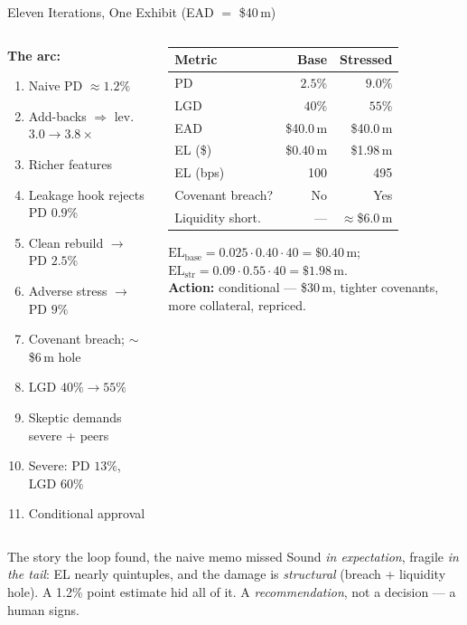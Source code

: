 \documentclass[9pt,t]{beamer}
\begin{document}
\begin{frame}{Eleven Iterations, One Exhibit (EAD $=$ \$40\,m)}

\begin{columns}[T]
\begin{column}{0.40\textwidth}
\footnotesize
\textbf{The arc:}
\begin{enumerate}\footnotesize
  \item Naive PD $\approx 1.2\%$
  \item Add-backs $\Rightarrow$ lev.\ $3.0\to3.8\times$
  \item Richer features
  \item \alert{Leakage hook rejects} PD $0.9\%$
  \item Clean rebuild $\to$ PD $2.5\%$
  \item Adverse stress $\to$ PD $9\%$
  \item Covenant breach; $\sim$\$6\,m hole
  \item LGD $40\%\to55\%$
  \item Skeptic demands severe + peers
  \item Severe: PD $13\%$, LGD $60\%$
  \item Conditional approval
\end{enumerate}
\end{column}
\begin{column}{0.60\textwidth}
\begin{table}
\centering\small
\begin{tabular}{@{}lrr@{}}
\toprule
Metric & Base & Stressed \\
\midrule
PD & $2.5\%$ & $9.0\%$ \\
LGD & $40\%$ & $55\%$ \\
EAD & \$40.0\,m & \$40.0\,m \\
EL (\$) & \$0.40\,m & \$1.98\,m \\
EL (bps) & 100 & 495 \\
Covenant breach? & No & Yes \\
Liquidity short. & --- & $\approx$\$6.0\,m \\
\bottomrule
\end{tabular}
\end{table}
\smallskip
\footnotesize
$\mathrm{EL}_{\text{base}}=0.025\cdot0.40\cdot40=\$0.40$\,m;\;
$\mathrm{EL}_{\text{str}}=0.09\cdot0.55\cdot40=\$1.98$\,m.
\smallskip\\
\textbf{Action:} conditional --- \$30\,m, tighter covenants, more collateral,
repriced.
\end{column}
\end{columns}

\medskip
\begin{alertblock}{The story the loop found, the naive memo missed}
Sound \emph{in expectation}, fragile \emph{in the tail}: EL nearly quintuples, and
the damage is \emph{structural} (breach + liquidity hole). A 1.2\% point estimate
hid all of it. A \emph{recommendation}, not a decision --- a human signs.
\end{alertblock}
\end{frame}
\end{document}

